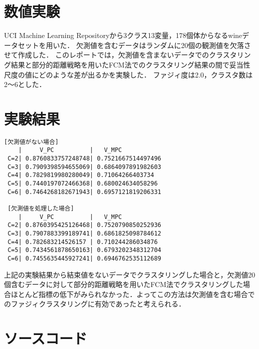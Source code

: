 \documentclass[dvipdfmx]{ujarticle}
\begin{document}
\section{数値実験}
UCI Machine Learning Repositoryから3クラス13変量，178個体からなるwineデータセットを用いた．
欠測値を含むデータはランダムに20個の観測値を欠落させて作成した．
このレポートでは，欠測値を含まないデータでのクラスタリング結果と部分的距離戦略を用いたFCM法でのクラスタリング結果の間で妥当性尺度の値にどのような差が出るかを実験した．
ファジィ度は2.0，クラスタ数は2〜6とした．

\section{実験結果}
\begin{verbatim}
[欠測値がない場合]
    |     V_PC          |   V_MPC
 C=2| 0.8760833757248748| 0.7521667514497496
 C=3| 0.7909398594655069| 0.6864097891982603
 C=4| 0.7829819980280049| 0.71064266403734
 C=5| 0.7440197072466368| 0.680024634058296
 C=6| 0.7464268182671943| 0.6957121819206331
 
 [欠測値を処理した場合]
    |     V_PC          |   V_MPC
 C=2| 0.8760395425126468| 0.7520790850252936
 C=3| 0.7907883399189741| 0.6861825098784612
 C=4| 0.782683214526157 | 0.710244286034876
 C=5| 0.7434561878650163| 0.6793202348312704
 C=6| 0.7455635445927241| 0.6946762535112689
\end{verbatim}

上記の実験結果から結束値をないデータでクラスタリングした場合と，欠測値20個含むデータに対して部分的距離戦略を用いたFCM法でクラスタリングした場合ほとんど指標の低下がみられなかった．よってこの方法は欠測値を含む場合でのファジィクラスタリングに有効であったと考えられる．

\section{ソースコード}

\small
{}

\normalsize
\end{document}
